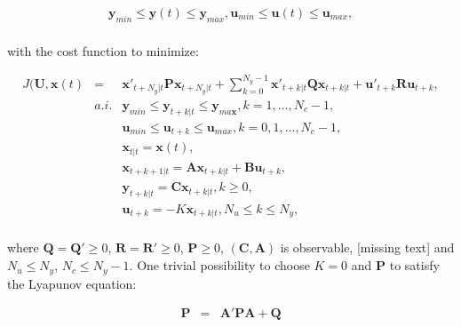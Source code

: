 		\begin{equation}
        \begin{array}{c}
				\textbf{y}_{min}\leq \textbf{y}(t)\leq \textbf{y}_{max},\textbf{u}_{min}\leq \textbf{u}(t)\leq \textbf{u}_{max},\\
        \end{array}
        \label{BASICMPC:equ:receiding_horison_constraints}
    \end{equation}
		
		
with the cost function to minimize:
		
		\begin{equation}
        \begin{array}{rcl}
				J(\textbf{U},\textbf{x}(t)&=&\textbf{x}'_{t+N_y|t}\textbf{P}\textbf{x}_{t+N_y|t}+\sum^{N_y-1}_{k=0}\textbf{x}'_{t+k|t}\textbf{Q}\textbf{x}_{t+k|t}+\textbf{u}'_{t+k}\textbf{R}\textbf{u}_{t+k},\\
				&a.i.&\textbf{y}_{min}\leq \textbf{y}_{t+k|t}\leq \textbf{y}_{ma\textbf{x}},k=1,\dots,N_c-1,\\
				&&\textbf{u}_{min}\leq \textbf{u}_{t+k}\leq \textbf{u}_{max},k=0,1,\dots,N_c-1,\\
				&&\textbf{x}_{t|t}=\textbf{x}(t),\\
				&&\textbf{x}_{t+k+1|t}=\textbf{A}\textbf{x}_{t+k|t}+\textbf{B}\textbf{u}_{t+k},\\
				&&\textbf{y}_{t+k|t}=\textbf{C}\textbf{x}_{t+k|t}, k\geq0,\\
				&&\textbf{u}_{t+k}=-K\textbf{x}_{t+k|t}, N_u\leq k\leq N_y,\\
        \end{array}
        \label{BASICMPC:equ:receiding_horison_problem}
    \end{equation}
		
		where $\textbf{Q}=\textbf{Q}'\geq0$, $\textbf{R}=\textbf{R}'\geq0$, $\textbf{P}\geq0$, $(\textbf{C},\textbf{A})$ is observable, [missing text] and $N_u\leq N_y$, $N_c\leq N_y-1$. One trivial possibility to choose $K=0$ and $\textbf{P}$ to satisfy the Lyapunov equation:
		
		\begin{equation}
        \begin{array}{rcl}
				\textbf{P}&=&\textbf{A}'\textbf{PA}+\textbf{Q}\\
        \end{array}
        \label{BASICMPC:equ:receiding_horison_Lyapunov}
    \end{equation}
		
